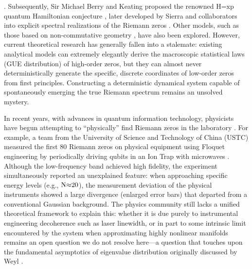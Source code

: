 \documentclass[fractalfract,article,submit,oneauthor,pdftex]{Definitions/mdpi}
\begin{document}
\cite{berrytabor1977}. Subsequently, Sir Michael Berry and
Keating proposed the renowned \(\text{H}\text{=}\text{xp}\) quantum
Hamiltonian conjecture \cite{berry1999}, later developed by Sierra and
collaborators into explicit spectral realizations of the Riemann zeros
\cite{sierra2009,sierrarodriguez2011}. Other models, such as those based on
non-commutative geometry \cite{connes1999}, have also been explored. However,
current theoretical research has generally fallen into a stalemate:
existing analytical models can extremely elegantly derive the
macroscopic statistical laws (GUE distribution) of high-order zeros, but
they can almost never deterministically generate the specific, discrete
coordinates of low-order zeros from first principles. Constructing a
deterministic dynamical system capable of spontaneously emerging the
true Riemann spectrum remains an unsolved mystery.

In recent years, with advances in quantum information technology,
physicists have begun attempting to ``physically'' find Riemann zeros in
the laboratory \cite{he2020}. For example, a team from the University of Science and
Technology of China (USTC) measured the first 80 Riemann
zeros on physical equipment using Floquet engineering by periodically
driving qubits in an Ion Trap with microwaves \cite{he2021}. Although the
low-frequency band achieved high fidelity, the experiment
simultaneously reported an unexplained feature: when approaching
specific energy levels (e.g., \(\text{N}\text{\ensuremath{\approx}20}\)), the measurement
deviation of the physical instruments showed a large divergence
(enlarged error bars) that departed from a conventional Gaussian background.
The physics community still lacks a unified theoretical framework to
explain this: whether it is due purely to instrumental engineering
decoherence such as laser linewidth, or in part to some intrinsic limit
encountered by the system when approximating highly nonlinear
manifolds remains an open question we do not resolve here---a question
that touches upon the fundamental asymptotics of
eigenvalue distribution originally discussed by Weyl \cite{weyl1912}.
\end{document}
